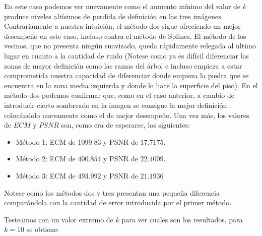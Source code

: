 En este caso podemos ver nuevamente como el aumento mínimo del valor de $k$ produce niveles altísimos de perdida de definición en las tres imágenes. Contrariamente a nuestra intuición, el método dos sigue ofreciendo un mejor desempeño en este caso, incluso contra el método de Splines. El método de los vecinos, que no presenta ningún suavizado, queda rápidamente relegada al ultimo lugar en cuanto a la cantidad de ruido (Notese como ya es difícil diferenciar las zonas de mayor definición como las ramas del árbol e incluso empieza a estar comprometida nuestra capacidad de diferenciar donde empieza la piedra que se encuentra en la zona media izquierda y donde lo hace la superficie del piso). En el método dos podemos confirmar que, como en el caso anterior, a cambio de introducir cierto sombreado en la imagen se consigue la mejor definición colocándolo nuevamente como el de mejor desempeño.
Una vez más, los valores de $ECM$ y $PSNR$ son, como era de esperarse, los siguientes:
\begin{itemize}
 \item Método 1: ECM de $1099.83$ y PSNR de $17.7175$.
 \item Método 2: ECM de $400.854$ y PSNR de $22.1009$.
 \item Método 3: ECM de $493.992$ y PSNR de $21.1936$
\end{itemize}
Notese como los métodos dos y tres presentan una pequeña diferencia comparándola con la cantidad de error introducida por el primer método.

Testeamos con un valor extremo de $k$ para ver cuales son los resultados, para $k=10$ se obtiene:

